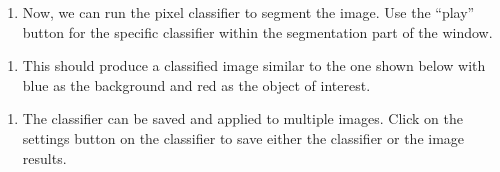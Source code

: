 \documentclass[letterpaper,10pt,english]{jupyterBook}
\begin{document}
\sphinxAtStartPar
{}
\begin{enumerate}
%
\setcounter{enumi}{2}
\item {} 
\sphinxAtStartPar
Now, we can run the pixel classifier to segment the image. Use the “play” button for the specific classifier within the segmentation part of the window.

\end{enumerate}

\sphinxAtStartPar
{}
\begin{enumerate}
%
\setcounter{enumi}{3}
\item {} 
\sphinxAtStartPar
This should produce a classified image similar to the one shown below with blue as the background and red as the object of interest.

\end{enumerate}

\sphinxAtStartPar
{}
\begin{enumerate}
%
\setcounter{enumi}{4}
\item {} 
\sphinxAtStartPar
The classifier can be saved and applied to multiple images. Click on the settings button on the classifier to save either the classifier or the image results.

\end{enumerate}

\sphinxAtStartPar
{}

\sphinxstepscope
\end{document}
